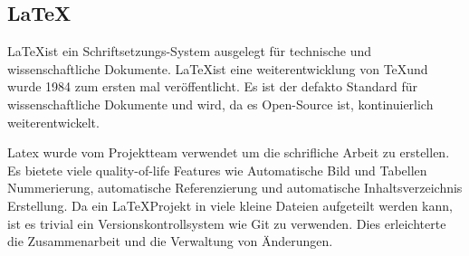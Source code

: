 \subsection{\LaTeX}
\label{sec:latex}

\LaTeX ist ein Schriftsetzungs-System ausgelegt für technische und wissenschaftliche Dokumente. \LaTeX ist eine weiterentwicklung von \TeX und wurde 1984 zum ersten mal veröffentlicht. Es ist der defakto Standard für wissenschaftliche Dokumente und wird, da es Open-Source ist, kontinuierlich weiterentwickelt. 

Latex wurde vom Projektteam verwendet um die schrifliche Arbeit zu erstellen. Es bietete viele quality-of-life Features wie Automatische Bild und Tabellen Nummerierung, automatische Referenzierung und automatische Inhaltsverzeichnis Erstellung. Da ein \LaTeX Projekt in viele kleine Dateien aufgeteilt werden kann, ist es trivial ein Versionskontrollsystem wie Git zu verwenden. Dies erleichterte die Zusammenarbeit und die Verwaltung von Änderungen.